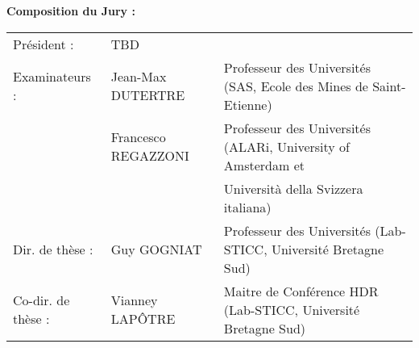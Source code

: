 {\vspace{\baselineskip}
{\normalTwelve \textbf{Composition du Jury :}}\\ \newline
\footnotesizeTwelve
\begin{tabular}{@{}lll}
Pr\'{e}sident :        & TBD & \\
Examinateurs :         & Jean-Max DUTERTRE & Professeur des Universités (SAS, Ecole des Mines de Saint-Etienne) \\
                       & Francesco REGAZZONI & Professeur des Universités (ALARi, University of Amsterdam et\\ & & Università della Svizzera italiana) \\
Dir. de th\`{e}se :    & Guy GOGNIAT & Professeur des Universités (Lab-STICC, Université Bretagne Sud) \\
Co-dir. de th\`{e}se : & Vianney LAP\^OTRE & Maitre de Conférence HDR (Lab-STICC, Université Bretagne Sud) \\
\end{tabular}
}

\maketitle
